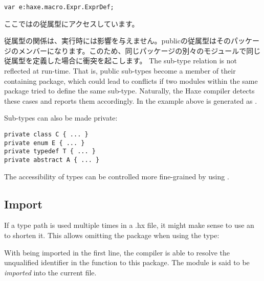 \begin{lstlisting}
var e:haxe.macro.Expr.ExprDef;
\end{lstlisting}

ここではの従属型にアクセスしています。

従属型の関係は、実行時には影響を与えません。publicの従属型はそのパッケージのメンバーになります。このため、同じパッケージの別々のモジュールで同じ従属型を定義した場合に衝突を起こします。
The sub-type relation is not reflected at run-time. That is, public sub-types become a member of their containing package, which could lead to conflicts if two modules within the same package tried to define the same sub-type. Naturally, the Haxe compiler detects these cases and reports them accordingly. In the example above  is generated as .

Sub-types can also be made private:

\begin{lstlisting}
private class C { ... }
private enum E { ... }
private typedef T { ... }
private abstract A { ... }
\end{lstlisting}


The accessibility of types can be controlled more fine-grained by using .



\subsection{Import}
\label{type-system-import}

If a type path is used multiple times in a .hx file, it might make sense to use an  to shorten it. This allows omitting the package when using the type:


With  being imported in the first line, the compiler is able to resolve the unqualified identifier  in the  function to this package. The module  is said to be \emph{imported} into the current file.


